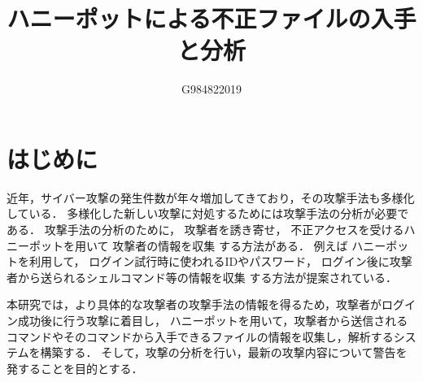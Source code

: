 \documentclass[dvipdfmx]{bta}
\title{ハニーポットによる不正ファイルの入手と分析}
\author{G984822019}{吉村　直将}
\begin{document}
\maketitle
\listoffigures

\chapter{はじめに}


近年，サイバー攻撃の発生件数が年々増加してきており，その攻撃手法も多様化している．
多様化した新しい攻撃に対処するためには攻撃手法の分析が必要である．
攻撃手法の分析のために，  攻撃者を誘き寄せ，
不正アクセスを受けるハニーポットを用いて
攻撃者の情報を収集
する方法がある．
例えば
ハニーポットを利用して，
ログイン試行時に使われるIDやパスワード，
ログイン後に攻撃者から送られるシェルコマンド等の情報を収集
する方法が提案されている\cite{Entry}．





本研究では，より具体的な攻撃者の攻撃手法の情報を得るため，攻撃者がログイン成功後に行う攻撃に着目し，
ハニーポットを用いて，攻撃者から送信されるコマンドやそのコマンドから入手できるファイルの情報を収集し，解析するシステムを構築する．
そして，攻撃の分析を行い，最新の攻撃内容について警告を発することを目的とする．
\end{document}
